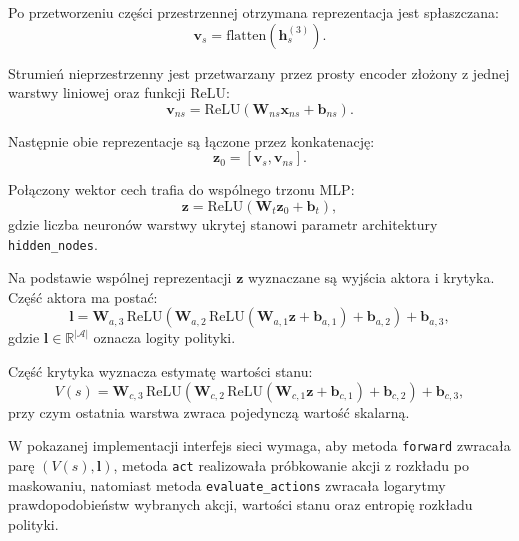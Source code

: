 Po przetworzeniu części przestrzennej otrzymana reprezentacja jest spłaszczana:
\begin{equation}
	\mathbf{v}_s = \mathrm{flatten}\!\left(\mathbf{h}_s^{(3)}\right).
\end{equation}

Strumień nieprzestrzenny jest przetwarzany przez prosty encoder złożony z jednej
warstwy liniowej oraz funkcji ReLU:
\begin{equation}
	\mathbf{v}_{ns} = \mathrm{ReLU}\!\left(\mathbf{W}_{ns}\mathbf{x}_{ns} + \mathbf{b}_{ns}\right).
\end{equation}

Następnie obie reprezentacje są łączone przez konkatenację:
\begin{equation}
	\mathbf{z}_0 = \left[\mathbf{v}_s,\mathbf{v}_{ns}\right].
\end{equation}

Połączony wektor cech trafia do wspólnego trzonu MLP:
\begin{equation}
	\mathbf{z} = \mathrm{ReLU}\!\left(\mathbf{W}_t \mathbf{z}_0 + \mathbf{b}_t\right),
\end{equation}
gdzie liczba neuronów warstwy ukrytej stanowi parametr architektury
\texttt{hidden\_nodes}.

Na podstawie wspólnej reprezentacji \(\mathbf{z}\) wyznaczane są wyjścia aktora
i krytyka. Część aktora ma postać:
\begin{equation}
	\mathbf{l} =
	\mathbf{W}_{a,3}\,
	\mathrm{ReLU}\!\left(
	\mathbf{W}_{a,2}\,
	\mathrm{ReLU}\!\left(
	\mathbf{W}_{a,1}\mathbf{z} + \mathbf{b}_{a,1}
	\right) + \mathbf{b}_{a,2}
	\right) + \mathbf{b}_{a,3},
\end{equation}
gdzie \( \mathbf{l} \in \mathbb{R}^{|\mathcal{A}|} \) oznacza logity polityki.

Część krytyka wyznacza estymatę wartości stanu:
\begin{equation}
	V(s) =
	\mathbf{W}_{c,3}\,
	\mathrm{ReLU}\!\left(
	\mathbf{W}_{c,2}\,
	\mathrm{ReLU}\!\left(
	\mathbf{W}_{c,1}\mathbf{z} + \mathbf{b}_{c,1}
	\right) + \mathbf{b}_{c,2}
	\right) + \mathbf{b}_{c,3},
\end{equation}
przy czym ostatnia warstwa zwraca pojedynczą wartość skalarną.

W pokazanej implementacji interfejs sieci wymaga, aby metoda \texttt{forward}
zwracała parę \((V(s), \mathbf{l})\), metoda \texttt{act} realizowała próbkowanie
akcji z rozkładu po maskowaniu, natomiast metoda \texttt{evaluate\_actions}
zwracała logarytmy prawdopodobieństw wybranych akcji, wartości stanu oraz entropię
rozkładu polityki.

